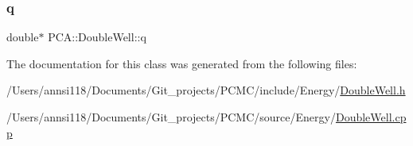 \hypertarget{class_p_c_a_1_1_double_well_a48e5423a6cef47d097a6374ca6745429}{}\label{class_p_c_a_1_1_double_well_a48e5423a6cef47d097a6374ca6745429} 
\subsubsection{\texorpdfstring{q}{q}}
{\footnotesize\ttfamily double$\ast$ P\+C\+A\+::\+Double\+Well\+::q\hspace{0.3cm}{\ttfamily [private]}}



The documentation for this class was generated from the following files\+:\begin{DoxyCompactItemize}
\item 
/\+Users/annsi118/\+Documents/\+Git\+\_\+projects/\+P\+C\+M\+C/include/\+Energy/\hyperlink{_double_well_8h}{Double\+Well.\+h}\item 
/\+Users/annsi118/\+Documents/\+Git\+\_\+projects/\+P\+C\+M\+C/source/\+Energy/\hyperlink{_double_well_8cpp}{Double\+Well.\+cpp}\end{DoxyCompactItemize}
